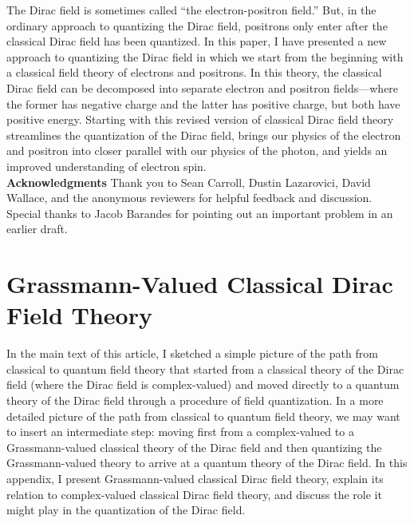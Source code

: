 \documentclass[onecolumn,secnumarabic,amsmath,amssymb,balancelastpage,nofootinbib]{article}
\begin{document}
The Dirac field is sometimes called ``the electron-positron field.''  But, in the ordinary approach to quantizing the Dirac field, positrons only enter after the classical Dirac field has been quantized.  In this paper, I have presented a new approach to quantizing the Dirac field in which we start from the beginning with a classical field theory of electrons and positrons.  In this theory, the classical Dirac field can be decomposed into separate electron and positron fields---where the former has negative charge and the latter has positive charge, but both have positive energy.  Starting with this revised version of classical Dirac field theory streamlines the quantization of the Dirac field, brings our physics of the electron and positron into closer parallel with our physics of the photon, and yields an improved understanding of electron spin.\\



\vspace*{12 pt}
\noindent
\textbf{Acknowledgments}
Thank you to Sean Carroll, Dustin Lazarovici, David Wallace, and the anonymous reviewers for helpful feedback and discussion.  Special thanks to Jacob Barandes for pointing out an important problem in an earlier draft.\\

\appendix
\section{Grassmann-Valued Classical Dirac Field Theory}\label{GrassmannCDFT}

In the main text of this article, I sketched a simple picture of the path from classical to quantum field theory that started from a classical theory of the Dirac field (where the Dirac field is complex-valued) and moved directly to a quantum theory of the Dirac field through a procedure of field quantization.  In a more detailed picture of the path from classical to quantum field theory, we may want to insert an intermediate step: moving first from a complex-valued to a Grassmann-valued classical theory of the Dirac field and then quantizing the Grassmann-valued theory to arrive at a quantum theory of the Dirac field.  In this appendix, I present Grassmann-valued classical Dirac field theory, explain its relation to complex-valued classical Dirac field theory, and discuss the role it might play in the quantization of the Dirac field.
\end{document}
